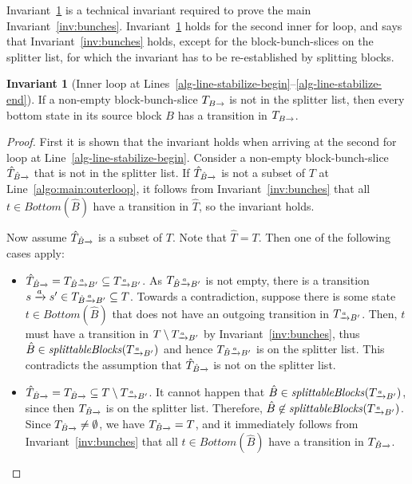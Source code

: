 \documentclass[a4paper,10pt]{article}
\theoremstyle{definition}
\newtheorem{invariant}[definition]{Invariant}
\theoremstyle{plain}
\newcommand{\pijl}[1]{\mathrel{\text{$\xrightarrow{\smash[t]{#1}}$}}}
\newcommand{\TB}{T_{B\pijl{}}}
\newcommand{\TaB}{T_{\pijl{a} B'}}
\newcommand{\Bottom}{\mathit{Bottom}}
\newcommand{\splittableBlocks}{\mathit{splittableBlocks}}
\begin{document}
Invariant~\ref{inv:second_inner_loop} is a technical invariant required to prove the main Invariant~\ref{inv:bunches}.
Invariant~\ref{inv:second_inner_loop} holds for the second inner for loop,
and says that Invariant~\ref{inv:bunches} holds,
except for the block-bunch-slices on the splitter list,
for which the invariant has to be re-established by splitting blocks.

\begin{invariant}[Inner loop at Lines~\ref{alg-line-stabilize-begin}--\ref{alg-line-stabilize-end}]
\label{inv:second_inner_loop}
	If a non-empty block-bunch-slice $\TB$ is not in the splitter list,
	then every bottom state in its source block $B$ has a transition in $\TB$.
\end{invariant}
%
\begin{proof}
First it is shown that the invariant holds when arriving at the second for loop at Line~\ref{alg-line-stabilize-begin}.
Consider a non-empty block-bunch-slice $\hat{T}_{\smash[t]{\hat{B}}\pijl{}}$ that is not in the splitter list.
If $\hat{T}_{\smash[t]{\hat{B}}\pijl{}}$ is not a subset of $T$ at Line~\ref{algo:main:outerloop},
it follows from Invariant~\ref{inv:bunches} that all $t\in \Bottom(\hat{B})$ have a transition in $\hat{T}$, so the invariant holds.

Now assume $\hat{T}_{\smash[t]{\hat{B}}\pijl{}}$ is a subset of $T$. Note that $\hat{T} = T$.
Then one of the following cases apply:
\begin{itemize}
\item
	$\hat{T}_{\smash[t]{\hat{B}}\pijl{}} = T_{\smash[t]{\hat{B}}\pijl{a}B'} \subseteq \TaB$.
	As $T_{\smash[t]{\hat{B}}\pijl{a}B'}$ is not empty,
	there is a transition $s\pijl{a}s'\in T_{\smash[t]{\hat{B}}\pijl{a}B'} \subseteq T$.
	Towards a contradiction, suppose there is some state $t\in\Bottom(\hat{B})$ that does not have an outgoing transition in $\TaB$.
	Then, $t$ must have a transition in $T \setminus \TaB$ by Invariant~\ref{inv:bunches},
	thus $\hat{B}\in \splittableBlocks(\TaB)$
	and hence $T_{\smash[t]{\hat{B}}\pijl{a}B'}$ is on the splitter list.
	This contradicts the assumption that $\hat{T}_{\smash[t]{\hat{B}}\pijl{}}$ is not on the splitter list.
\item
	$\hat{T}_{\smash[t]{\hat{B}}\pijl{}} = T_{\smash[t]{\hat{B}}\pijl{}}\subseteq T\setminus \TaB$.
	It cannot happen that $\hat{B} \in \splittableBlocks(\TaB)$, since
	then $T_{\smash[t]{\hat{B}}\pijl{}}$ is on the splitter list.
	Therefore, $\hat{B} \not \in \splittableBlocks(\TaB)$.
	Since $T_{\smash[t]{\hat{B}}\pijl{}} \neq \emptyset$, we have $T_{\smash[t]{\hat{B}}\pijl{}} = T$,
	and it immediately follows from Invariant~\ref{inv:bunches}
	that all $t\in \Bottom(\hat{B})$ have a transition in $T_{\smash[t]{\hat{B}}\pijl{}}$.
\end{itemize}


\end{proof}
\end{document}
